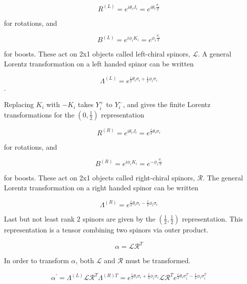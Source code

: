 \begin{equation}
R^{(L)} = e^{i\theta_i J_i} = e^{i\theta_i \frac{\sigma_i}{2}}   
\end{equation}

for rotations, and

\begin{equation}
B^{(L)} = e^{i\phi_i K_i} = e^{\phi_i \frac{\sigma_i}{2}}   
\end{equation}

for boosts. These act on 2x1 objects called left-chiral spinors, $\mathcal{L}$. A general Lorentz transformation on a left handed spinor can be written

\begin{equation}
\Lambda^{(L)} = e^{\frac{i}{2}\theta_i \sigma_i + \frac{1}{2}\phi_i \sigma_i}
\end{equation}.

Replacing $K_i$ with $-K_i$ takes $Y^+_i$ to $Y^-_i$, and gives the finite Lorentz transformations for the $(0, \frac{1}{2})$ representation 

\begin{equation}
R^{(R)} = e^{i\theta_i J_i} = e^{\frac{i}{2}\theta_i \sigma_i}   
\end{equation}

for rotations, and

\begin{equation}
B^{(R)} = e^{i\phi_i K_i} = e^{-\phi_i \frac{\sigma_i}{2}}   
\end{equation}

for boosts. These act on 2x1 objects called right-chiral spinors, $\mathcal{R}$. The general Lorentz transformation on a right handed spinor can be written

\begin{equation}
\Lambda^{(R)} = e^{\frac{i}{2}\theta_i \sigma_i - \frac{1}{2}\phi_i \sigma_i}
\end{equation}

Last but not least rank 2 spinors are given by the $(\frac{1}{2}, \frac{1}{2})$ representation. This representation is a tensor combining two spinors via outer product.

\begin{equation}
\alpha = \mathcal{L} \mathcal{R}^{T}
\end{equation}

In order to transform $\alpha$, both $\mathcal{L}$ and $\mathcal{R}$ must be transformed.

\begin{equation}
\alpha^{'} = \Lambda^{(L)} \mathcal{L} \mathcal{R}^T \Lambda^{(R)T} 
 = e^{\frac{i}{2}\theta_i \sigma_i + \frac{1}{2}\phi_i \sigma_i} \mathcal{L} \mathcal{R}^T e^{\frac{i}{2}\theta_i \sigma_i^T - \frac{1}{2}\phi_i \sigma_i^T} 
\end{equation}

